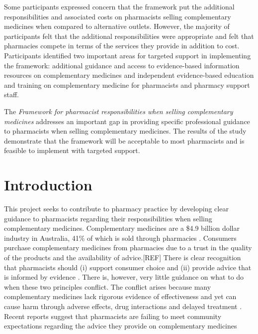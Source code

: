 \documentclass[11pt,a4paper]{article}
\begin{document}
Some participants expressed concern that the framework put the
additional responsibilities and associated costs on pharmacists selling
complementary medicines when compared to alternative outlets. However,
the majority of participants felt that the additional responsibilities
were appropriate and felt that pharmacies compete in terms of the
services they provide in addition to cost. Participants identified two
important areas for targeted support in implementing the framework:
additional guidance and access to evidence-based information resources
on complementary medicines and independent evidence-based education and
training on complementary medicine for pharmacists and pharmacy support
staff.

The \emph{Framework for pharmacist responsibilities when selling
complementary medicines} addresses an important gap in providing
specific professional guidance to pharmacists when selling complementary
medicines. The results of the study demonstrate that the framework will
be acceptable to most pharmacists and is feasible to implement with
targeted support.

\newpage

\section{Introduction}\label{introduction}

This project seeks to contribute to pharmacy practice by developing
clear guidance to pharmacists regarding their responsibilities when
selling complementary medicines. Complementary medicines are a \$4.9
billion dollar industry in Australia, 41\% of which is sold through
pharmacies \autocite{ComplementaryMedicinesAustralia2018}. Consumers
purchase complementary medicines from pharmacies due to a trust in the
quality of the products and the availability of advice.{[}REF{]} There
is clear recognition that pharmacists should (i) support consumer choice
and (ii) provide advice that is informed by evidence
\autocites{InternationalPharmaceuticalFederation2014}{PSA2017}. There
is, however, very little guidance on what to do when these two
principles conflict. The conflict arises because many complementary
medicines lack rigorous evidence of effectiveness and yet can cause harm
through adverse effects, drug interactions and delayed treatment
\autocites{Myers2004}{Izzo2009}. Recent reports suggest that pharmacists
are failing to meet community expectations regarding the advice they
provide on complementary medicines
\autocites{Bray2017}{Thompson2017}{Arnold2016}[.][]{King2017}
\end{document}
